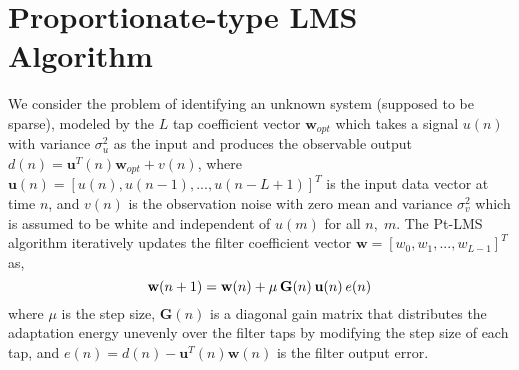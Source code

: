 \documentclass[journal, one column]{IEEEtran}
\begin{document}
\section{Proportionate-type LMS Algorithm}
We consider the problem of identifying an unknown system (supposed to
be sparse), modeled by the $L$ tap coefficient vector $\textbf{w}_{opt}$
which takes a signal $u(n)$ with variance $\sigma_{u}^{2}$
as the input and produces the observable output
$d(n)=\textbf{u}^{T}(n) \textbf{w}_{opt} + v(n)$, where
$\textbf{u}(n)=[ {u}(n), {u}(n-1), . . . , {u}(n-L+1)]^{T}$ is the
input data vector at time $n$, and $v(n)$ is the observation
noise with zero mean and variance $\sigma_{v}^{2}$ which is assumed to be white and independent of
$u(m)$ for all $n,\;m$. The Pt-LMS algorithm iteratively updates
the filter coefficient vector $\textbf{w}=[w_{0}, w_{1}, . . .,
w_{L-1}]^{T}$ as,
\begin{equation}\label{eq1.1}
\textbf{w}(n+1)=\textbf{w}(n)+ \mu \hspace{0.2em} \textbf{G}(n) \hspace{0.2em} \textbf{u}(n) \hspace{0.2em} e(n)
\end{equation}
where  $\mu$ is the step size, $\textbf{G}(n)$ is a diagonal gain
matrix that distributes the adaptation energy unevenly over the
filter taps by modifying the step size of each tap, and
$e(n)=d(n)-\textbf{u}^{T}(n)\textbf{w}(n)$ is the filter output
error.
\par
\end{document}
